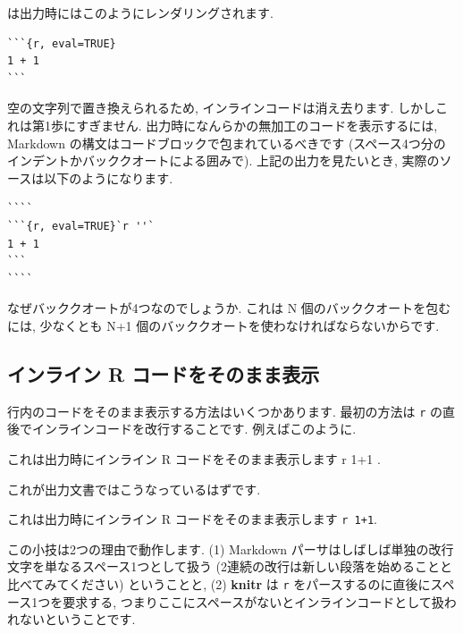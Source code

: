 \documentclass[
  11pt,
]{bxjsreport}
\newenvironment{Shaded}{\begin{snugshade}}{\end{snugshade}}
\newcommand{\InformationTok}[1]{\textcolor[rgb]{0.56,0.35,0.01}{\textbf{\textit{#1}}}}
\newcommand{\NormalTok}[1]{#1}
\renewenvironment{quote}{\begin{VF}}{\end{VF}}
\renewenvironment{quote}{\def\FrameCommand{{\color{quotebarcolor}{\vrule width 3pt}}\hspace{10pt}}\MakeFramed{\advance\hsize-\width\FrameRestore}}{\endMakeFramed}
\begin{document}
は出力時にはこのようにレンダリングされます.

\begin{verbatim}
```{r, eval=TRUE}
1 + 1
```
\end{verbatim}

空の文字列で置き換えられるため, インラインコードは消え去ります. しかしこれは第1歩にすぎません. 出力時になんらかの無加工のコードを表示するには, Markdown の構文はコードブロックで包まれているべきです (スペース4つ分のインデントかバッククオートによる囲みで). 上記の出力を見たいとき, 実際のソースは以下のようになります.

\begin{verbatim}
````
```{r, eval=TRUE}`r ''`
1 + 1
```
````
\end{verbatim}

なぜバッククオートが4つなのでしょうか. これは N 個のバッククオートを包むには, 少なくとも N+1 個のバッククオートを使わなければならないからです.

\hypertarget{show-a-verbatim-inline-expression}{%
\subsection{インライン R コードをそのまま表示}\label{show-a-verbatim-inline-expression}}

行内のコードをそのまま表示する方法はいくつかあります. 最初の方法は \texttt{\textasciigrave{}r} の直後でインラインコードを改行することです. 例えばこのように.

\begin{Shaded}
\begin{Highlighting}[]
\NormalTok{これは出力時にインライン R コードをそのまま表示します \textasciigrave{}}\InformationTok{\textasciigrave{} \textasciigrave{}}\NormalTok{r}
\NormalTok{1+1\textasciigrave{} \textasciigrave{}\textasciigrave{}.}
\end{Highlighting}
\end{Shaded}

これが出力文書ではこうなっているはずです.

\begin{quote}
これは出力時にインライン R コードをそのまま表示します \texttt{\textasciigrave{}r\ 1+1\textasciigrave{}}.
\end{quote}

この小技は2つの理由で動作します. (1) Markdown パーサはしばしば単独の改行文字を単なるスペース1つとして扱う (2連続の改行は新しい段落を始めることと比べてみてください) ということと, (2) \textbf{knitr} は \texttt{\textasciigrave{}r} をパースするのに直後にスペース1つを要求する, つまりここにスペースがないとインラインコードとして扱われないということです.
\end{document}
